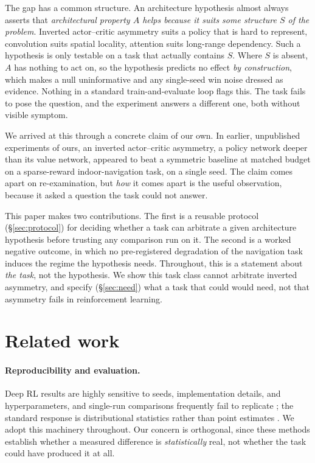\documentclass{article}
\begin{document}
The gap has a common structure. An architecture hypothesis almost always asserts that
\emph{architectural property $A$ helps because it suits some structure $S$ of the problem}.
Inverted actor--critic asymmetry suits a policy that is hard to represent, convolution suits
spatial locality, attention suits long-range dependency. Such a hypothesis is only testable
on a task that actually contains $S$. Where $S$ is absent, $A$ has nothing to act on, so the
hypothesis predicts no effect \emph{by construction}, which makes a null uninformative and any
single-seed win noise dressed as evidence. Nothing in a standard train-and-evaluate loop
flags this. The task fails to pose the question, and the experiment answers a different one,
both without visible symptom.

We arrived at this through a concrete claim of our own. In earlier, unpublished experiments
of ours, an inverted actor--critic asymmetry, a policy network deeper than its value network,
appeared to beat a symmetric baseline at matched budget on a sparse-reward indoor-navigation
task, on a single seed. The claim comes apart on re-examination, but \emph{how} it comes
apart is the useful observation, because it asked a question the task could not answer.

This paper makes two contributions. The first is a reusable protocol
(\S\ref{sec:protocol}) for deciding whether a task can arbitrate a given architecture
hypothesis before trusting any comparison run on it. The second is a worked negative outcome,
in which no pre-registered degradation of the navigation task induces the regime the
hypothesis needs. Throughout, this is a statement about \emph{the task}, not the hypothesis.
We show this task class cannot arbitrate inverted asymmetry, and specify
(\S\ref{sec:need}) what a task that could would need, not that asymmetry fails in
reinforcement learning.

\section{Related work}
\label{sec:related}

\paragraph{Reproducibility and evaluation.} Deep RL results are highly sensitive to seeds,
implementation details, and hyperparameters, and single-run comparisons frequently fail to
replicate \citep{henderson2018matters}; the standard response is distributional statistics
rather than point estimates \citep{agarwal2021precipice}. We adopt this machinery throughout.
Our concern is orthogonal, since these methods establish whether a measured difference is
\emph{statistically} real, not whether the task could have produced it at all.
\end{document}
